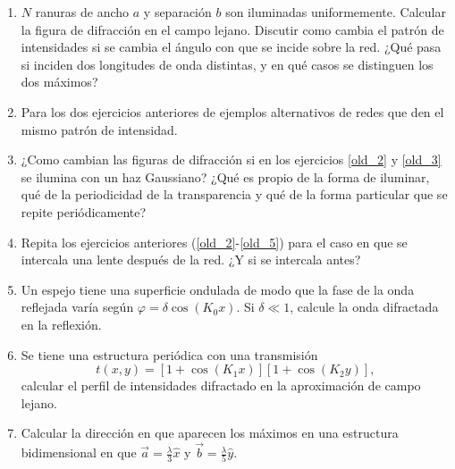 \documentclass[11pt,spanish,a4paper]{article}
\begin{document}
\begin{enumerate}
	
\item \label{old_3} \( N \) ranuras de ancho \( a \) y separación \( b \) son iluminadas uniformemente.
	Calcular la	figura de difracción en el campo lejano.
	Discutir como cambia el patrón de intensidades si se cambia el ángulo con que se incide sobre la red.
	¿Qué pasa si inciden dos longitudes de onda distintas, y en qué casos se distinguen los dos máximos?
	
	
\item Para los dos ejercicios anteriores de ejemplos alternativos de redes que den el mismo	patrón de intensidad.
	
	
\item \label{old_5} ¿Como cambian las figuras de difracción si en los ejercicios \ref{old_2} y \ref{old_3} se ilumina con un haz Gaussiano?
	¿Qué es propio de la forma de iluminar, qué de la periodicidad de la transparencia y qué de la forma particular que se repite periódicamente?
	
	
\item Repita los ejercicios anteriores (\ref{old_2}-\ref{old_5}) para el caso en que se intercala una lente después de la red.
	¿Y si se intercala antes?
	

\item Un espejo tiene una superficie ondulada de modo que la fase de la onda reflejada varía según \( \varphi= \delta \cos{ (K_0 x) } \).
	Si \( \delta \ll 1 \), calcule la onda difractada en la reflexión.

	
\item Se tiene una estructura periódica con una transmisión
	\[
		t(x,y)= \left[ 1 + \cos{ (K_1 x) } \right] \left[ 1 + \cos{ (K_2 y ) } \right],
	\]
	calcular el perfil de intensidades difractado en la aproximación de campo lejano.

	
\item Calcular la dirección en que aparecen los máximos en una estructura bidimensional en que \( \vec{a} = \frac{\lambda}{3} \hat{x} \) y \( \vec{b} = \frac{\lambda}{5} \hat{y} \).


\end{enumerate}	
\end{document}
